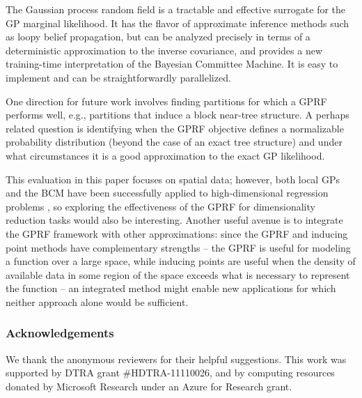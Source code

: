 \documentclass{article}
\begin{document}
The Gaussian process random field is a tractable and effective
surrogate for the GP marginal likelihood. It has the flavor of
approximate inference methods such as loopy belief propagation, but
can be analyzed precisely in terms of a deterministic approximation to
the inverse covariance, and provides a new training-time
interpretation of the Bayesian Committee Machine. It is easy to
implement and can be straightforwardly parallelized. 

One direction for future work involves finding partitions for
which a GPRF performs well, e.g., partitions that induce a block near-tree
structure. A perhaps related question is identifying when the GPRF
objective defines a normalizable probability
distribution (beyond the case of an exact tree structure) and under
what circumstances it is a good approximation to the exact GP likelihood.

This evaluation in this paper focuses on spatial data; however, both local
GPs and the BCM have been successfully applied to high-dimensional
regression problems \cite{chalupka2012, deisenroth2015distributed}, so
exploring the effectiveness of the GPRF for dimensionality reduction
tasks would also be interesting. Another useful avenue is to integrate the
GPRF framework with other approximations: since the GPRF and inducing
point methods have complementary strengths -- the GPRF is useful for
modeling a function over a large space, while inducing points are useful
when the density of available data in some region of the space
exceeds what is necessary to represent the function -- an integrated
method might enable new applications for which neither approach alone
would be sufficient. 

\subsubsection*{Acknowledgements}

We thank the anonymous reviewers for their helpful 
suggestions.  This work was supported by DTRA grant \#HDTRA-11110026,
and by computing resources donated by Microsoft Research under an Azure for Research grant.
 

{\small }
\end{document}
